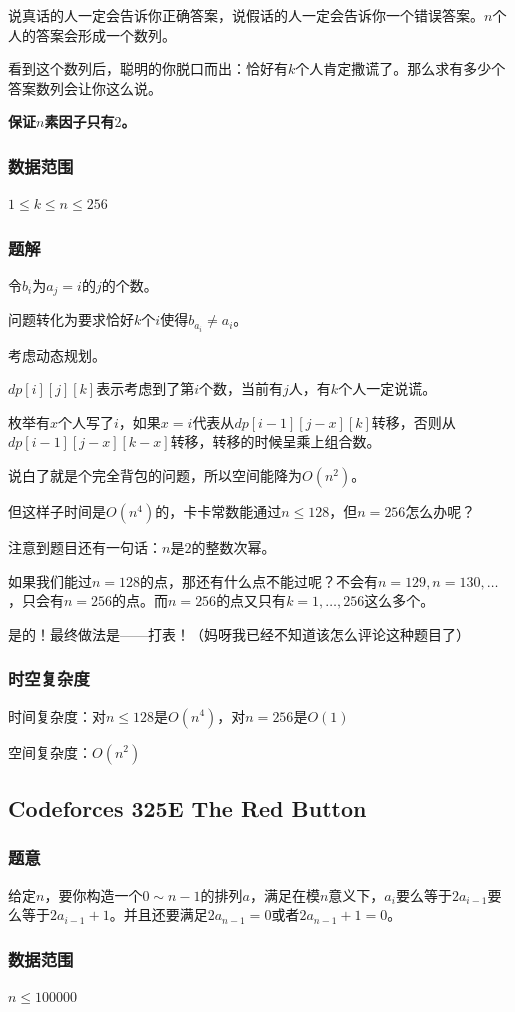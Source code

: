\documentclass{ctexart}
\begin{document}
说真话的人一定会告诉你正确答案，说假话的人一定会告诉你一个错误答案。$n$个人的答案会形成一个数列。

看到这个数列后，聪明的你脱口而出：恰好有$k$个人肯定撒谎了。那么求有多少个答案数列会让你这么说。

\textbf{保证$n$素因子只有$2$。}
\subsubsection{数据范围}
$1 \le k \le n \le 256$
\subsubsection{题解}
令$b_i$为$a_j=i$的$j$的个数。

问题转化为要求恰好$k$个$i$使得$b_{a_i} \neq a_i$。

考虑动态规划。

$dp[i][j][k]$表示考虑到了第$i$个数，当前有$j$人，有$k$个人一定说谎。

枚举有$x$个人写了$i$，如果$x=i$代表从$dp[i-1][j-x][k]$转移，否则从$dp[i-1][j-x][k-x]$转移，转移的时候呈乘上组合数。

说白了就是个完全背包的问题，所以空间能降为$O(n^2)$。

但这样子时间是$O(n^4)$的，卡卡常数能通过$n \le 128$，但$n=256$怎么办呢？

注意到题目还有一句话：$n$是$2$的整数次幂。

如果我们能过$n=128$的点，那还有什么点不能过呢？不会有$n=129,n=130,\ldots$，只会有$n=256$的点。而$n=256$的点又只有$k=1,\ldots,256$这么多个。

是的！最终做法是——打表！（妈呀我已经不知道该怎么评论这种题目了）
\subsubsection{时空复杂度}
时间复杂度：对$n\le 128$是$O(n^4)$，对$n=256$是$O(1)$

空间复杂度：$O(n^2)$
\subsection{Codeforces 325E The Red Button}
\subsubsection{题意}
给定$n$，要你构造一个$0 \sim n-1$的排列$a$，满足在模$n$意义下，$a_i$要么等于$2a_{i-1}$要么等于$2a_{i-1}+1$。并且还要满足$2a_{n-1}=0$或者$2a_{n-1}+1=0$。
\subsubsection{数据范围}
$n \le 100000$
\end{document}
